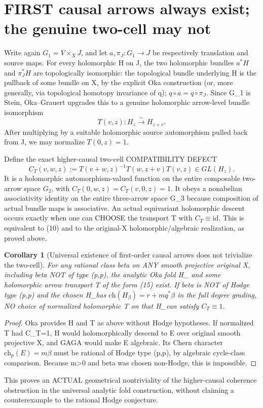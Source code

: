 \documentclass[11pt]{article}
\newtheorem{corollary}[theorem]{Corollary}
\begin{document}
\section{FIRST causal arrows always exist; the genuine two-cell may not}
Write again $G_1=V\times_XJ$,
and let $a,\pi_J:G_1\to J$ be respectively
translation and source maps.
For every holomorphic H on J,
the two holomorphic bundles
$a^*H$ and $\pi_J^*H$ are
topologically isomorphic: the topological
bundle underlying H is the pullback
of some bundle on X, by the explicit
Oka construction (or, more generally,
via topological homotopy invariance
of q); $q\circ a=q\circ\pi_J$.
Since G_1 is Stein, Oka--Grauert
upgrades this to a genuine
holomorphic arrow-level bundle isomorphism
\[
 T(v,z):H_z\overset{\sim}\to H_{z+v}.
 \tag{15}
\]
After multiplying by a suitable holomorphic
source automorphism pulled back from J,
we may normalize $T(0,z)=1$.

Define the exact higher-causal two-cell
COMPATIBILITY DEFECT
\[
 \boxed{
 C_T(v,w,z):=
 T(v+w,z)^{-1}
  T(w,z+v)T(v,z)\in GL(H_z).
 }                                                       \tag{16}
\]
It is a holomorphic automorphism-valued
function on the entire composable
two-arrow space $G_2$, with
$C_T(0,w,z)=C_T(v,0,z)=1$.
It obeys a nonabelian associativity
identity on the entire three-arrow
space G_3 because composition of
actual bundle maps is associative.
An actual equivariant holomorphic
descent occurs exactly when one can
CHOOSE the transport T with
$C_T\equiv\mathrm{id}$. This is
equivalent to (10) and to the
original-X holomorphic/algebraic
realization, as proved above.

\begin{corollary}[Universal existence of first-order causal arrows does not trivialize the two-cell]
For any rational class beta on ANY
smooth projective original X,
including beta NOT of type (p,p),
the analytic Oka fold H_\beta
and some holomorphic arrow
transport T of the form (15) exist.
If beta is NOT of Hodge type (p,p)
and the chosen H_\beta has
$\mathrm{ch}(H_\beta)=r+m q^*\beta$
in the full degree grading,
NO choice of normalized holomorphic
T on that H_\beta can satisfy
$C_T\equiv1$.
\end{corollary}
\begin{proof}
Oka provides H and T as above
without Hodge hypotheses.
If normalized T had C_T=1,
H would holomorphically descend
to E over original smooth
projective X, and GAGA would
make E algebraic. Its Chern
character $\mathrm{ch}_p(E)=m\beta$
must be rational of Hodge type
(p,p), by algebraic cycle-class
comparison. Because m>0 and
beta was chosen non-Hodge,
this is impossible.
\end{proof}
This proves an ACTUAL geometrical
nontriviality of the higher-causal
coherence obstruction in the
universal analytic fold construction,
without claiming a counterexample
to the rational Hodge conjecture.
\end{document}
